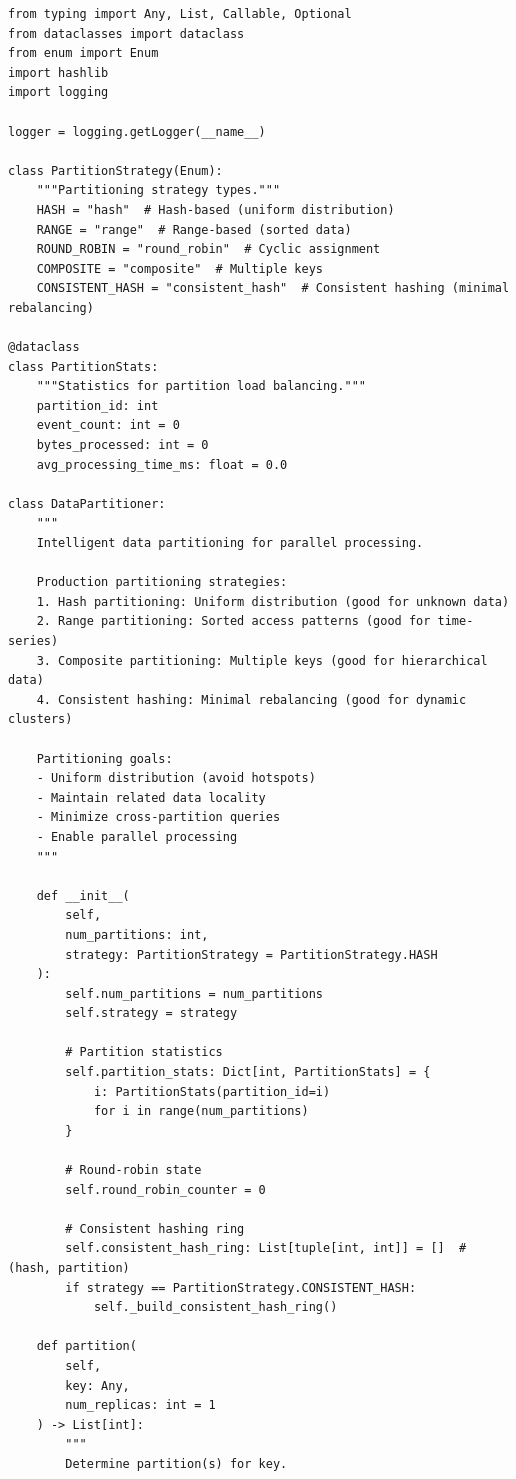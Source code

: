 \begin{lstlisting}[style=python, caption={Data Partitioning Strategies}]
from typing import Any, List, Callable, Optional
from dataclasses import dataclass
from enum import Enum
import hashlib
import logging

logger = logging.getLogger(__name__)

class PartitionStrategy(Enum):
    """Partitioning strategy types."""
    HASH = "hash"  # Hash-based (uniform distribution)
    RANGE = "range"  # Range-based (sorted data)
    ROUND_ROBIN = "round_robin"  # Cyclic assignment
    COMPOSITE = "composite"  # Multiple keys
    CONSISTENT_HASH = "consistent_hash"  # Consistent hashing (minimal rebalancing)

@dataclass
class PartitionStats:
    """Statistics for partition load balancing."""
    partition_id: int
    event_count: int = 0
    bytes_processed: int = 0
    avg_processing_time_ms: float = 0.0

class DataPartitioner:
    """
    Intelligent data partitioning for parallel processing.

    Production partitioning strategies:
    1. Hash partitioning: Uniform distribution (good for unknown data)
    2. Range partitioning: Sorted access patterns (good for time-series)
    3. Composite partitioning: Multiple keys (good for hierarchical data)
    4. Consistent hashing: Minimal rebalancing (good for dynamic clusters)

    Partitioning goals:
    - Uniform distribution (avoid hotspots)
    - Maintain related data locality
    - Minimize cross-partition queries
    - Enable parallel processing
    """

    def __init__(
        self,
        num_partitions: int,
        strategy: PartitionStrategy = PartitionStrategy.HASH
    ):
        self.num_partitions = num_partitions
        self.strategy = strategy

        # Partition statistics
        self.partition_stats: Dict[int, PartitionStats] = {
            i: PartitionStats(partition_id=i)
            for i in range(num_partitions)
        }

        # Round-robin state
        self.round_robin_counter = 0

        # Consistent hashing ring
        self.consistent_hash_ring: List[tuple[int, int]] = []  # (hash, partition)
        if strategy == PartitionStrategy.CONSISTENT_HASH:
            self._build_consistent_hash_ring()

    def partition(
        self,
        key: Any,
        num_replicas: int = 1
    ) -> List[int]:
        """
        Determine partition(s) for key.


\end{lstlisting}
